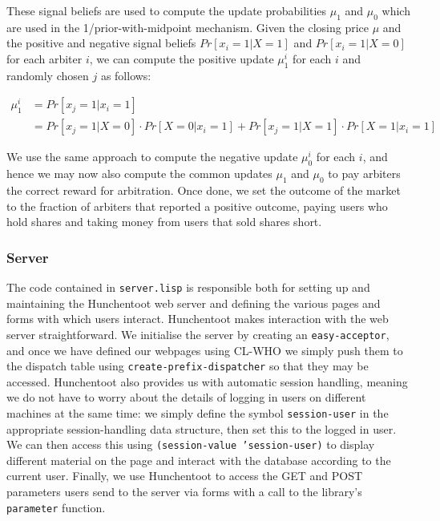 \documentclass[10pt,a4paper]{article}
\theoremstyle{plain}
\theoremstyle{definition}
\newcommand{\code}[1]{\texttt{#1}}
\begin{document}
These signal beliefs are used to compute the update probabilities $\mu_1$ and
$\mu_0$ which are used in the 1/prior-with-midpoint mechanism. Given the
closing price $\mu$ and the positive and negative signal beliefs
$Pr[x_i=1|X=1]$ and $Pr[x_i=1|X=0]$ for each arbiter $i$, we can compute the
positive update $\mu_1^i$ for each $i$ and randomly chosen $j$ as follows:

\begin{equation}
	\begin{aligned}
		\mu_1^i & = Pr[x_j=1|x_i=1] \\
		& = Pr[x_j=1|X=0] \cdot Pr[X=0|x_i=1] + Pr[x_j=1|X=1] \cdot Pr[X=1|x_i=1]
	\end{aligned}
\end{equation}

We use the same approach to compute the negative update $\mu_0^i$ for each $i$,
and hence we may now also compute the common updates $\mu_1$ and $\mu_0$ to pay
arbiters the correct reward for arbitration. Once done, we set the outcome of
the market to the fraction of arbiters that reported a positive outcome, paying
users who hold shares and taking money from users that sold shares short.

\subsubsection{Server}

The code contained in \code{server.lisp} is responsible both for setting up and
maintaining the Hunchentoot web server and defining the various pages and forms
with which users interact.  Hunchentoot makes interaction with the web server
straightforward. We initialise the server by creating an \code{easy-acceptor},
and once we have defined our webpages using CL-WHO we simply push them to the
dispatch table using \code{create-prefix-dispatcher} so that they may be
accessed. Hunchentoot also provides us with automatic session handling, meaning
we do not have to worry about the details of logging in users on different
machines at the same time: we simply define the symbol \code{session-user} in
the appropriate session-handling data structure, then set this to the logged in
user. We can then access this using \code{(session-value 'session-user)} to
display different material on the page and interact with the database according
to the current user. Finally, we use Hunchentoot to access the GET and POST
parameters users send to the server via forms with a call to the library's
\code{parameter} function. 
\end{document}
